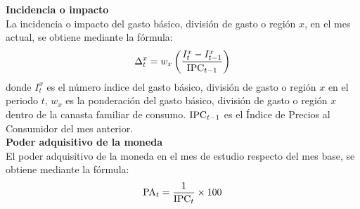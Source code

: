 {\textbf{Incidencia o impacto}\\
La incidencia o impacto del gasto básico, división de gasto o región $x$, en el mes actual, se obtiene mediante la fórmula:
\begin{align*}
	\Delta_{t}^{x} = w_x \left( \frac{I_t^x - I_{t-1}^x}{\text{IPC}_{t-1}} \right)
\end{align*}
donde $I_t^x$ es el número índice del gasto básico, división de gasto o región $x$ en el periodo $t$, $w_x$ es la ponderación del gasto básico, división de gasto o región $x$ dentro de la canasta familiar de consumo. $\text{IPC}_{t-1}$ es el Índice de Precios al Consumidor del mes anterior.\\

\textbf{Poder adquisitivo de la moneda}\\
El poder adquisitivo de la moneda en el mes de estudio respecto del mes base, se obtiene mediante la fórmula:
\begin{align*}
	\text{PA}_t = \frac{1}{\text{IPC}_{t}} \times 100
\end{align*}
}

